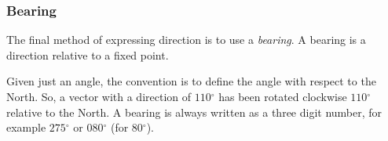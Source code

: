     \addtocounter{footnote}{-0}
    \par 
      
      \label{m38812*uid7}
            \subsubsection{ Bearing}
            \nopagebreak
            
        
        \label{m38812*id187384}The final method of expressing direction is to use a \textsl{bearing}. A bearing is a direction relative to a fixed point.\par 
        \label{m38812*id187393}Given just an angle, the convention is to define the angle with respect to the North. So, a vector with a direction of \begin{math}110{}^{\circ }\end{math} has been rotated clockwise \begin{math}110{}^{\circ }\end{math} relative to the North. A bearing is always written as a three digit number, for example \begin{math}275{}^{\circ }\end{math} or \begin{math}080{}^{\circ }\end{math} (for \begin{math}80{}^{\circ }\end{math}).\par 
        \label{m38812*id187459}
          
    \setcounter{subfigure}{0}


